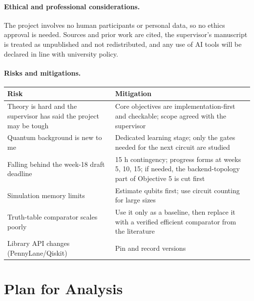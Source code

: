 \documentclass[11pt,a4paper]{article}
\begin{document}
\paragraph{Ethical and professional considerations.}
The project involves no human participants or personal data, so no ethics approval is needed. Sources and prior work are cited, the supervisor's manuscript is treated as unpublished and not redistributed, and any use of AI tools will be declared in line with university policy.

\paragraph{Risks and mitigations.}
\begin{center}
\small
\begin{tabularx}{\textwidth}{@{}>{\raggedright\arraybackslash}p{}X@{}}
\toprule
\textbf{Risk} & \textbf{Mitigation} \\
\midrule
Theory is hard and the supervisor has said the project may be tough & Core objectives are implementation-first and checkable; scope agreed with the supervisor \\
Quantum background is new to me & Dedicated learning stage; only the gates needed for the next circuit are studied \\
Falling behind the week-18 draft deadline & 15 h contingency; progress forms at weeks 5, 10, 15; if needed, the backend-topology part of Objective 5 is cut first \\
Simulation memory limits & Estimate qubits first; use circuit counting for large sizes \\
Truth-table comparator scales poorly & Use it only as a baseline, then replace it with a verified efficient comparator from the literature \\
Library API changes (PennyLane/Qiskit) & Pin and record versions \\
\bottomrule
\end{tabularx}
\end{center}

\section{Plan for Analysis}
\end{document}
